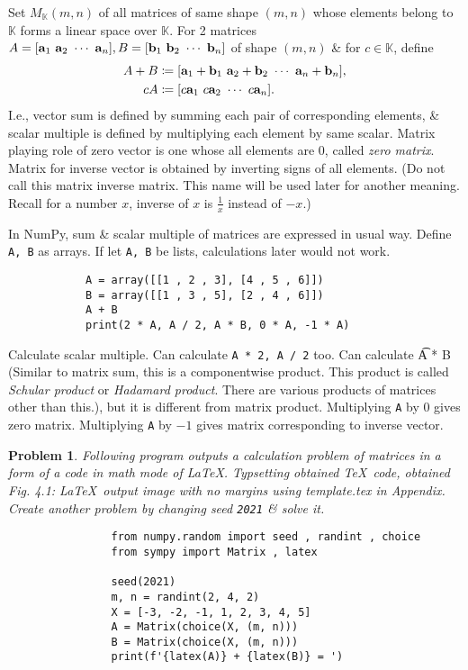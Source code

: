 \documentclass{article}
\newtheorem{problem}{Problem}
\begin{document}
\begin{itemize}
\begin{itemize}
		Set $M_{\mathbb{K}}(m,n)$ of all matrices of same shape $(m,n)$ whose elements belong to $\mathbb{K}$ forms a linear space over $\mathbb{K}$. For 2 matrices $A = [{\bf a}_1\ {\bf a}_2\ \cdots\ {\bf a}_n],B = [{\bf b}_1\ {\bf b}_2\ \cdots\ {\bf b}_n]$ of shape $(m,n)$ \& for $c\in\mathbb{K}$, define
		\begin{align*}
			A + B&\coloneqq[{\bf a}_1 + {\bf b}_1\ {\bf a}_2 + {\bf b}_2\ \cdots\ {\bf a}_n + {\bf b}_n],\\
			cA&\coloneqq[c{\bf a}_1\ c{\bf a}_2\ \cdots\ c{\bf a}_n].
		\end{align*}
		I.e., vector sum is defined by summing each pair of corresponding elements, \& scalar multiple is defined by multiplying each element by same scalar. Matrix playing role of zero vector is one whose all elements are 0, called {\it zero matrix}. Matrix for inverse vector is obtained by inverting signs of all elements. (Do not call this matrix inverse matrix. This name will be used later for another meaning. Recall for a number $x$, inverse of $x$ is $\frac{1}{x}$ instead of $-x$.)
		
		In NumPy, sum \& scalar multiple of matrices are expressed in usual way. Define {\tt A, B} as arrays. If let {\tt A, B} be lists, calculations later would not work.
		\begin{verbatim}
			A = array([[1 , 2 , 3], [4 , 5 , 6]])
			B = array([[1 , 3 , 5], [2 , 4 , 6]])
			A + B
			print(2 * A, A / 2, A * B, 0 * A, -1 * A)
		\end{verbatim}
		Calculate scalar multiple. Can calculate {\tt A * 2, A  / 2} too. Can calculate {\t A * B} (Similar to matrix sum, this is a componentwise product. This product is called {\it Schular product} or {\it Hadamard product}. There are various products of matrices other than this.), but it is different from matrix product. Multiplying {\tt A} by 0 gives zero matrix. Multiplying {\tt A} by $-1$ gives matrix corresponding to inverse vector.
		\begin{problem}
			Following program outputs a calculation problem of matrices in a form of a code in math mode of \LaTeX. Typsetting obtained \TeX\ code, obtained {\sf Fig. 4.1: \LaTeX\ output image with no margins using template.tex in Appendix.} Create another problem by changing seed {\tt2021} \& solve it.
			\begin{verbatim}
				from numpy.random import seed , randint , choice
				from sympy import Matrix , latex
				
				seed(2021)
				m, n = randint(2, 4, 2)
				X = [-3, -2, -1, 1, 2, 3, 4, 5]
				A = Matrix(choice(X, (m, n)))
				B = Matrix(choice(X, (m, n)))
				print(f'{latex(A)} + {latex(B)} = ')
				

\end{verbatim}
\end{problem}
\end{itemize}
\end{itemize}
\end{document}
